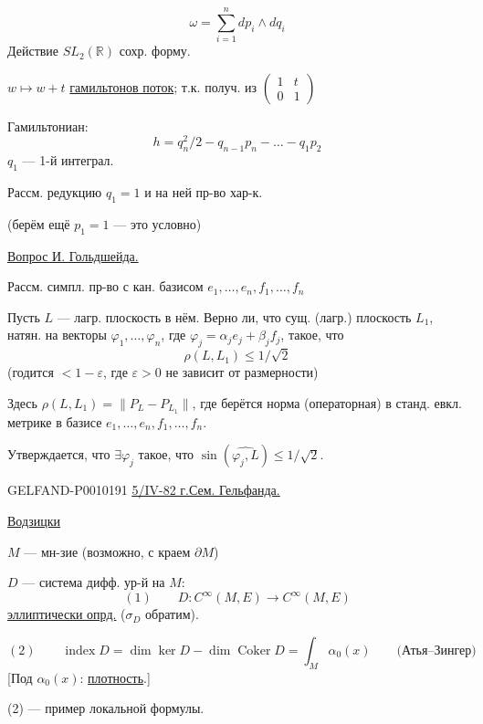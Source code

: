 \[
\omega=\sum_{i=1}^{n}dp_i\wedge dq_i
\]
Действие $SL_2(\mathbb{R})$ сохр. форму.

$w\mapsto w+t$ \underline{гамильтонов поток}; т.к. получ. из
$\begin{pmatrix}1&t\\0&1\end{pmatrix}$

Гамильтониан:
\[
h=q_n^2/2-q_{n-1}p_n-\ldots-q_1p_2
\]
$q_1$ --- 1-й интеграл.

Рассм. редукцию $q_1=1$ и на ней пр-во хар-к.

(берём ещё $p_1=1$ --- это условно)

\underline{Вопрос И. Гольдшейда.}

Рассм. симпл. пр-во с кан. базисом $e_1,\ldots,e_n,f_1,\ldots,f_n$

Пусть $L$ --- лагр. плоскость в нём.
Верно ли, что сущ. (лагр.) плоскость $L_1$, натян. на векторы $\varphi_1,\ldots,\varphi_n$, где
$\varphi_j=\alpha_j e_j+\beta_j f_j$, такое, что
\[
\rho(L,L_1)\le 1/\sqrt{2}
\]
(годится $<1-\varepsilon$, где $\varepsilon>0$ не зависит от размерности)

Здесь $\rho(L,L_1)=\|P_L-P_{L_1}\|$, где берётся норма (операторная) в станд. евкл. метрике в базисе
$e_1,\ldots,e_n,f_1,\ldots,f_n$.

Утверждается, что $\exists\varphi_j$ такое, что $\sin(\widehat{\varphi_j,L})\le 1/\sqrt{2}$.


\begin{GelfandAdjacentEvidence}{GELFAND-P001019}{1}
\underline{\underline{5/IV-82 г.}}\qquad\underline{Сем. Гельфанда.}

\underline{\underline{Водзицки}}

$M$ --- мн-зие (возможно, с краем $\partial M$)

$D$ --- система дифф. ур-й на $M$:
\[
(1)\qquad D:C^\infty(M,E)\longrightarrow C^\infty(M,E)
\]
\underline{эллиптически опрд.} ($\sigma_D$ обратим).

\end{GelfandAdjacentEvidence}

\[
(2)\qquad \operatorname{index}D=\dim\ker D-\dim\operatorname{Coker}D
=\int_M\alpha_0(x)\qquad\text{(Атья--Зингер)}
\]
[Под $\alpha_0(x)$: \underline{плотность}.]

(2) --- пример локальной формулы.

